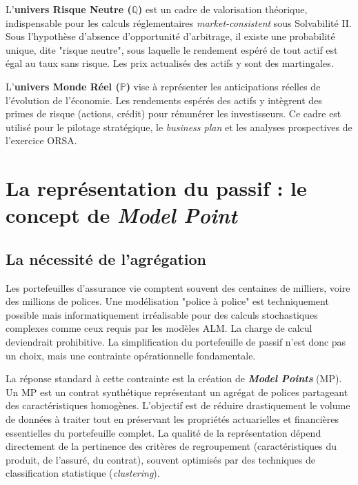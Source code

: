 L'\textbf{univers Risque Neutre ($\mathbb{Q}$)} est un cadre de valorisation théorique, indispensable pour les calculs réglementaires \textit{market-consistent} sous Solvabilité II. Sous l'hypothèse d'absence d'opportunité d'arbitrage, il existe une probabilité unique, dite "risque neutre", sous laquelle le rendement espéré de tout actif est égal au taux sans risque. Les prix actualisés des actifs y sont des martingales.

\bigskip

L'\textbf{univers Monde Réel ($\mathbb{P}$)} vise à représenter les anticipations réelles de l'évolution de l'économie. Les rendements espérés des actifs y intègrent des primes de risque (actions, crédit) pour rémunérer les investisseurs. Ce cadre est utilisé pour le pilotage stratégique, le \textit{business plan} et les analyses prospectives de l'exercice ORSA.


\section{La représentation du passif : le concept de \textit{Model Point}}
\label{sec:mp}

\subsection{La nécessité de l'agrégation}

Les portefeuilles d'assurance vie comptent souvent des centaines de milliers, voire des millions de polices. Une modélisation "police à police" est techniquement possible mais informatiquement irréalisable pour des calculs stochastiques complexes comme ceux requis par les modèles ALM. La charge de calcul deviendrait prohibitive. La simplification du portefeuille de passif n'est donc pas un choix, mais une contrainte opérationnelle fondamentale.

\bigskip

La réponse standard à cette contrainte est la création de \textbf{\textit{Model Points}} (MP). Un MP est un contrat synthétique représentant un agrégat de polices partageant des caractéristiques homogènes. L'objectif est de réduire drastiquement le volume de données à traiter tout en préservant les propriétés actuarielles et financières essentielles du portefeuille complet. La qualité de la représentation dépend directement de la pertinence des critères de regroupement (caractéristiques du produit, de l'assuré, du contrat), souvent optimisés par des techniques de classification statistique (\textit{clustering}).

